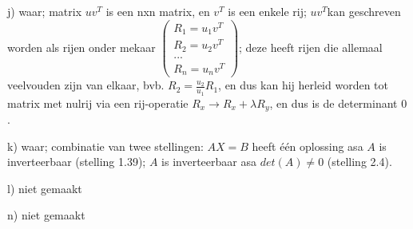 \documentclass{article}
\begin{document}
j) waar; matrix $uv^T$ is een nxn matrix, en $v^T$ is een enkele rij;  $uv^T$kan geschreven worden als rijen onder mekaar $\begin{pmatrix}R_1=u_1v^T\\R_2=u_2v^T\\...\\R_n=u_nv^T\end{pmatrix}$; deze heeft rijen die allemaal veelvouden zijn van elkaar, bvb. $R_2 = \frac{u_2}{u_1}R_1$, en dus kan hij herleid worden tot matrix met nulrij via een rij-operatie $R_x \rightarrow R_x+\lambda R_y$, en dus is de determinant $0$. 

k) waar; combinatie van twee stellingen: $AX=B$ heeft \'e\'en oplossing asa $A$ is inverteerbaar (stelling 1.39); $A$ is inverteerbaar asa $det(A) \neq 0$ (stelling 2.4). 

l) niet gemaakt

n)  niet gemaakt 
\end{document}
